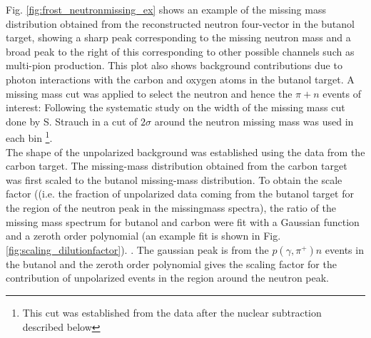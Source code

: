 Fig. \ref{fig:frost_neutronmissing_ex} shows an example of the missing mass distribution obtained from the reconstructed neutron four-vector in the butanol target, showing a sharp peak corresponding to the missing neutron mass and a broad peak to the right of this corresponding to other possible channels such as multi-pion production. This plot also shows background contributions due to photon interactions with the carbon and oxygen atoms in the butanol target.
A missing mass cut was applied to select the neutron and hence the $\pi + n$ events of interest: Following the systematic study on the width of the missing mass cut done by S. Strauch in \cite{Strauch_2014} a cut of $2 \sigma$ around the neutron missing mass was used in each bin \footnote{This cut was established from the data after the nuclear subtraction described below}. \\
The shape of the unpolarized background was established using the data from the carbon target. 
 The missing-mass distribution obtained from the carbon target was first scaled to the butanol missing-mass distribution. To obtain the scale factor ((i.e. the fraction of unpolarized data coming from the butanol target for the region of the neutron peak in the missingmass spectra), the ratio of the  missing mass spectrum for butanol and carbon were fit with a Gaussian function and a zeroth order polynomial (an example fit  is shown in Fig. \ref{fig:scaling_dilutionfactor}). . The gaussian peak is from the $p(\gamma,\pi^+)n$ events in the butanol and the zeroth order polynomial gives the scaling factor for the contribution of unpolarized events in the region around the neutron peak. \\
